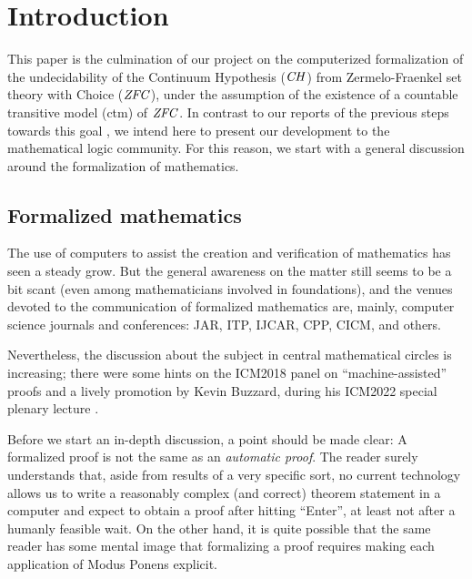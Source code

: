 \section{Introduction}
\label{sec:introduction}

This paper is the culmination of our project on the computerized
formalization of the undecidability of the Continuum Hypothesis
($\mathit{CH}$) from Zermelo-Fraenkel set theory with Choice ($\mathit{ZFC}$), under the
assumption of the existence of a countable transitive model (ctm) of
$\mathit{ZFC}$. In contrast to our reports of the previous steps towards this
goal
\cite{2018arXiv180705174G,2019arXiv190103313G,2020arXiv200109715G}, we
intend here to present our development to the mathematical logic
community. For this reason, we start with a general discussion around
the formalization of mathematics.

\subsection{Formalized mathematics}
The use of computers to assist the creation and verification of
mathematics has seen a steady grow. But the general awareness on the
matter still seems to be a bit scant (even among mathematicians
involved in foundations), and the venues devoted to the communication
of formalized mathematics are, mainly, computer science journals and
conferences: JAR, ITP, IJCAR, CPP, CICM, and others.

Nevertheless, the discussion about the subject in central mathematical
circles is increasing; there were some hints on the ICM2018 panel on
“machine-assisted” proofs
\cite{https://doi.org/10.48550/arxiv.1809.08062} and a lively
promotion by Kevin Buzzard, during his ICM2022 special plenary lecture
\cite{2021arXiv211211598B}.


Before we start an in-depth discussion, a point should be made clear:
A formalized proof is not the same as an \emph{automatic proof}. The
reader surely understands that, aside from results of a very specific sort, no current
technology allows us to write a reasonably complex (and correct)
theorem statement in a computer and expect to obtain a proof after hitting “Enter”, at
least not after a humanly feasible wait. On the other hand, it is
quite possible that the same reader has some mental image that
formalizing a proof requires making each application of Modus Ponens
explicit.

